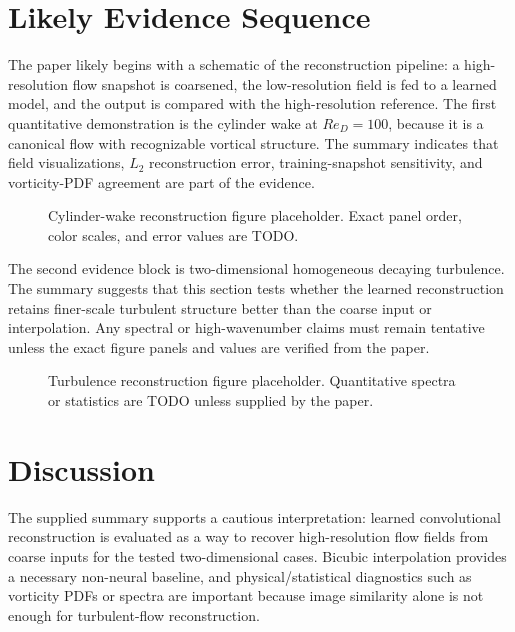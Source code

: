 \documentclass[11pt]{article}
\begin{document}
\section{Likely Evidence Sequence}
The paper likely begins with a schematic of the reconstruction pipeline: a high-resolution flow snapshot is coarsened, the low-resolution field is fed to a learned model, and the output is compared with the high-resolution reference. The first quantitative demonstration is the cylinder wake at $Re_D=100$, because it is a canonical flow with recognizable vortical structure. The summary indicates that field visualizations, $L_2$ reconstruction error, training-snapshot sensitivity, and vorticity-PDF agreement are part of the evidence.

\begin{figure}[h]
\centering
{}
\caption{Cylinder-wake reconstruction figure placeholder. Exact panel order, color scales, and error values are TODO.}
\label{fig:cylinder}
\end{figure}

The second evidence block is two-dimensional homogeneous decaying turbulence. The summary suggests that this section tests whether the learned reconstruction retains finer-scale turbulent structure better than the coarse input or interpolation. Any spectral or high-wavenumber claims must remain tentative unless the exact figure panels and values are verified from the paper.

\begin{figure}[h]
\centering
{}
\caption{Turbulence reconstruction figure placeholder. Quantitative spectra or statistics are TODO unless supplied by the paper.}
\label{fig:turbulence}
\end{figure}

\section{Discussion}
The supplied summary supports a cautious interpretation: learned convolutional reconstruction is evaluated as a way to recover high-resolution flow fields from coarse inputs for the tested two-dimensional cases. Bicubic interpolation provides a necessary non-neural baseline, and physical/statistical diagnostics such as vorticity PDFs or spectra are important because image similarity alone is not enough for turbulent-flow reconstruction.
\end{document}
